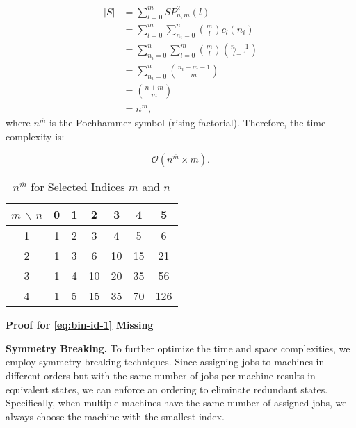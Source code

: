 \begin{align*}
    |S|
    &= \sum_{l=0}^m SP^2_{n,m}(l) \\
    &= \sum_{l=0}^m \sum_{n_i=0}^{n} \binom{m}{l} c_l(n_i) \\
    &= \sum_{n_i=0}^{n} \sum_{l=0}^m \binom{m}{l} \binom{n_i - 1}{l - 1} \\
    &= \sum_{n_i=0}^{n} \binom{n_i + m - 1}{m} \\
    &= \binom{n + m}{m} \\
    &= n^{\overline{m}},
\end{align*}
where $n^{\overline{m}}$ is the Pochhammer symbol (rising factorial). Therefore, the time complexity is:

\[
    \mathcal{O}\left( n^{\overline{m}} \times m \right).
\]

\begin{table}[h!]
    \centering
    \begin{tabular}{c|cccccc}
        \hline
        \textbf{\(m\)} $\backslash$ \textbf{\(n\)} & \textbf{0} & \textbf{1} & \textbf{2} & \textbf{3} & \textbf{4} & \textbf{5} \\
        \hline
        1                                          & 1          & 2          & 3          & 4          & 5          & 6          \\
        2                                          & 1          & 3          & 6          & 10         & 15         & 21         \\
        3                                          & 1          & 4          & 10         & 20         & 35         & 56         \\
        4                                          & 1          & 5          & 15         & 35         & 70         & 126        \\
        \hline
    \end{tabular}
    \label{tab:sss-merged-successors}
    \caption{\( n^{\overline{m}} \) for Selected Indices \(m\) and \(n\)}
\end{table}

\textbf{Proof for \autoref{eq:bin-id-1} Missing}

\textbf{Symmetry Breaking.} To further optimize the time and space complexities, we employ symmetry breaking techniques. Since assigning jobs to machines in different orders but with the same number of jobs per machine results in equivalent states, we can enforce an ordering to eliminate redundant states. Specifically, when multiple machines have the same number of assigned jobs, we always choose the machine with the smallest index.

